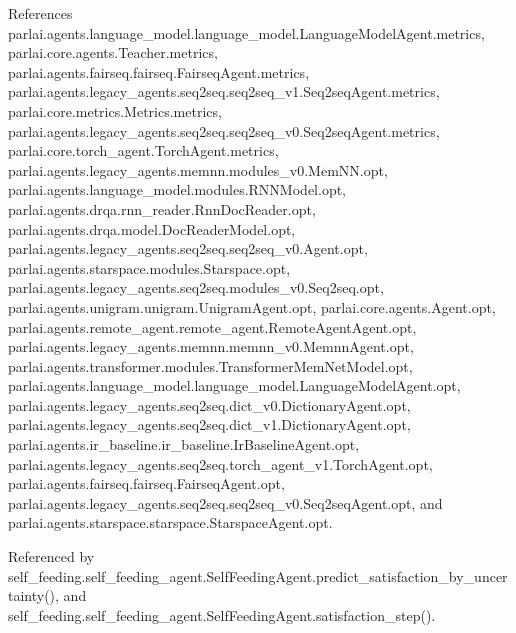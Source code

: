 References parlai.\+agents.\+language\+\_\+model.\+language\+\_\+model.\+Language\+Model\+Agent.\+metrics, parlai.\+core.\+agents.\+Teacher.\+metrics, parlai.\+agents.\+fairseq.\+fairseq.\+Fairseq\+Agent.\+metrics, parlai.\+agents.\+legacy\+\_\+agents.\+seq2seq.\+seq2seq\+\_\+v1.\+Seq2seq\+Agent.\+metrics, parlai.\+core.\+metrics.\+Metrics.\+metrics, parlai.\+agents.\+legacy\+\_\+agents.\+seq2seq.\+seq2seq\+\_\+v0.\+Seq2seq\+Agent.\+metrics, parlai.\+core.\+torch\+\_\+agent.\+Torch\+Agent.\+metrics, parlai.\+agents.\+legacy\+\_\+agents.\+memnn.\+modules\+\_\+v0.\+Mem\+N\+N.\+opt, parlai.\+agents.\+language\+\_\+model.\+modules.\+R\+N\+N\+Model.\+opt, parlai.\+agents.\+drqa.\+rnn\+\_\+reader.\+Rnn\+Doc\+Reader.\+opt, parlai.\+agents.\+drqa.\+model.\+Doc\+Reader\+Model.\+opt, parlai.\+agents.\+legacy\+\_\+agents.\+seq2seq.\+seq2seq\+\_\+v0.\+Agent.\+opt, parlai.\+agents.\+starspace.\+modules.\+Starspace.\+opt, parlai.\+agents.\+legacy\+\_\+agents.\+seq2seq.\+modules\+\_\+v0.\+Seq2seq.\+opt, parlai.\+agents.\+unigram.\+unigram.\+Unigram\+Agent.\+opt, parlai.\+core.\+agents.\+Agent.\+opt, parlai.\+agents.\+remote\+\_\+agent.\+remote\+\_\+agent.\+Remote\+Agent\+Agent.\+opt, parlai.\+agents.\+legacy\+\_\+agents.\+memnn.\+memnn\+\_\+v0.\+Memnn\+Agent.\+opt, parlai.\+agents.\+transformer.\+modules.\+Transformer\+Mem\+Net\+Model.\+opt, parlai.\+agents.\+language\+\_\+model.\+language\+\_\+model.\+Language\+Model\+Agent.\+opt, parlai.\+agents.\+legacy\+\_\+agents.\+seq2seq.\+dict\+\_\+v0.\+Dictionary\+Agent.\+opt, parlai.\+agents.\+legacy\+\_\+agents.\+seq2seq.\+dict\+\_\+v1.\+Dictionary\+Agent.\+opt, parlai.\+agents.\+ir\+\_\+baseline.\+ir\+\_\+baseline.\+Ir\+Baseline\+Agent.\+opt, parlai.\+agents.\+legacy\+\_\+agents.\+seq2seq.\+torch\+\_\+agent\+\_\+v1.\+Torch\+Agent.\+opt, parlai.\+agents.\+fairseq.\+fairseq.\+Fairseq\+Agent.\+opt, parlai.\+agents.\+legacy\+\_\+agents.\+seq2seq.\+seq2seq\+\_\+v0.\+Seq2seq\+Agent.\+opt, and parlai.\+agents.\+starspace.\+starspace.\+Starspace\+Agent.\+opt.



Referenced by self\+\_\+feeding.\+self\+\_\+feeding\+\_\+agent.\+Self\+Feeding\+Agent.\+predict\+\_\+satisfaction\+\_\+by\+\_\+uncertainty(), and self\+\_\+feeding.\+self\+\_\+feeding\+\_\+agent.\+Self\+Feeding\+Agent.\+satisfaction\+\_\+step().

